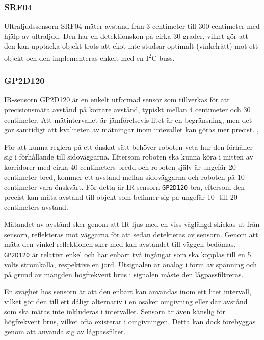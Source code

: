 \documentclass[11pt]{article}
\begin{document}
\begin{flushleft}
\subsubsection{SRF04} %
Ultraljudssensorn SRF04 mäter avstånd från 3 centimeter till 300 centimeter med hjälp av ultraljud. Den har en detektionskon på cirka 30 grader, vilket gör att den kan upptäcka objekt trots att ekot inte studsar optimalt (vinkelrätt) mot ett objekt och den implementeras enkelt med en I\textsuperscript{2}C-buss. \cite{Devantech}

\subsubsection{GP2D120} %
IR-sensorn GP2D120 är en enkelt utformad sensor som tillverkas för att precisionsmäta avstånd på kortare avstånd, typiskt mellan 4 centimeter och 30 centimeter. Att mätintervallet är jämförelsevis litet är en begränsning, men det gör samtidigt att kvaliteten av mätningar inom intevallet kan göras mer precist. \cite{website:cmu}, \cite{Sharp}

För att kunna reglera på ett önskat sätt behöver roboten veta hur den förhåller sig i förhållande till sidoväggarna. Eftersom roboten ska kunna köra i mitten av korridorer med cirka 40 centimeters bredd och roboten själv är ungefär 20 centimeter bred, kommer ett avstånd mellan sidoväggarna och roboten på 10 centimeter vara önskvärt. För detta är IR-sensorn \verb+GP2D120+ bra, eftersom den precist kan mäta avstånd till objekt som befinner sig på ungefär 10- till 20 centimeters avstånd.

Mätandet av avstånd sker genom att IR-ljus med en viss våglängd skickas ut från sensorn, reflekteras mot väggarna för att sedan detekteras av sensorn. Genom att mäta den vinkel reflektionen sker med kan avståndet till väggen bedömas. \verb+GP2D120+ är relativt enkel och har enbart två ingångar som ska kopplas till en 5 volts strömkälla, respektive en jord.  Utsignalen är analog i form av spänning och på grund av mängden högfrekvent brus i signalen måste den lågpassfiltreras. \cite{Sharp}

En svaghet hos sensorn är att den enbart kan användas inom ett litet intervall, vilket gör den till ett dåligt alternativ i en osäker omgivning eller där avstånd som ska mätas inte inkluderas i intervallet. Sensorn är även känslig för högfrekvent brus, vilket ofta existerar i omgivningen. Detta kan dock förebyggas genom att använda sig av lågpassfilter. \cite{Sharp}


\end{flushleft}
\end{document}
